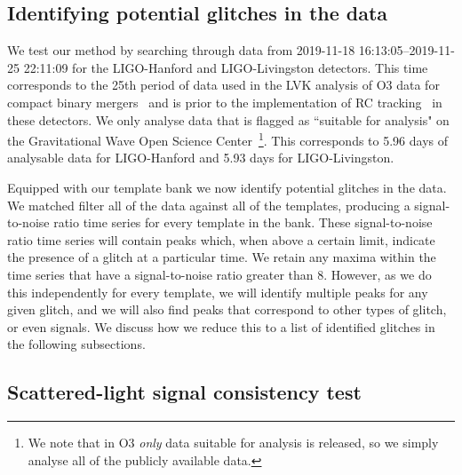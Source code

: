 \subsection{Identifying potential \scl{} glitches in the data}

We test our method by searching through \gw{} data from 2019-11-18 16:13:05--2019-11-25 22:11:09 for the LIGO-Hanford and LIGO-Livingston detectors. This time corresponds to the 25th period of data used in the LVK analysis of O3 data for compact binary mergers~\cite{gwtc3:2023} and is prior to the implementation of RC tracking~\cite{reducing_scattering:2020} in these detectors. We only analyse data that is flagged as ``suitable for analysis" on the Gravitational Wave Open Science Center~\cite{GWOSC:2021}\footnote{We note that in O3 \emph{only} data suitable for analysis is released, so we simply analyse all of the publicly available data.}. This corresponds to 5.96 days of analysable data for LIGO-Hanford and 5.93 days for LIGO-Livingston.

Equipped with our template bank we now identify potential \scl{} glitches in the data. We matched filter all of the data against all of the templates, producing a signal-to-noise ratio time series for every template in the bank. These signal-to-noise ratio time series will contain peaks which, when above a certain limit, indicate the presence of a \scl{} glitch at a particular time. We retain any maxima within the time series that have a signal-to-noise ratio greater than 8. However, as we do this independently for every template, we will identify multiple peaks for any given glitch, and we will also find peaks that correspond to other types of glitch, or even \gw{} signals. We discuss how we reduce this to a list of identified \scl{} glitches in the following subsections.

\subsection{Scattered-light signal consistency test}

